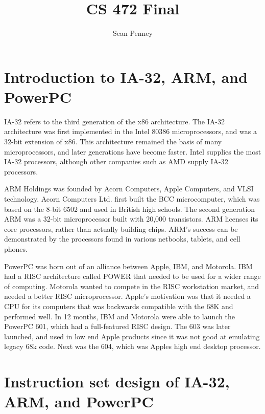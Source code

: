 \documentclass[letterpaper,10pt,titlepage,twocolumn]{article}
\begin{document}
\title{CS 472 Final}
\author{Sean Penney}
\maketitle

\section*{Introduction to IA-32, ARM, and PowerPC}

IA-32 refers to the third generation of the x86 architecture.
The IA-32 architecture was first implemented in the Intel 80386 microprocessors, and was a 32-bit extension of x86.
This architecture remained the basis of many microprocessors, and later generations have become faster.
Intel supplies the most IA-32 processors, although other companies such as AMD supply IA-32 processors.
\newline
\par

ARM Holdings was founded by Acorn Computers, Apple Computers, and VLSI technology.
Acorn Computers Ltd. first built the BCC microcomputer, which was based on the 8-bit 6502 and used in British high schools.
The second generation ARM was a 32-bit microprocessor built with 20,000 transistors.
ARM licenses its core processors, rather than actually building chips.
ARM's success can be demonstrated by the processors found in various netbooks, tablets, and cell phones.
\newline
\par

PowerPC was born out of an alliance between Apple, IBM, and Motorola.
IBM had a RISC architecture called POWER that needed to be used for a wider range of computing.
Motorola wanted to compete in the RISC workstation market, and needed a better RISC microprocessor.
Apple's motivation was that it needed a CPU for its computers that was backwards compatible with the 68K and performed well.
In 12 months, IBM and Motorola were able to launch the PowerPC 601, which had a full-featured RISC design.
The 603 was later launched, and used in low end Apple products since it was not good at emulating legacy 68k code.
Next was the 604, which was Apples high end desktop processor.
\newline
\par

\section*{Instruction set design of  IA-32, ARM, and PowerPC}
\end{document}
